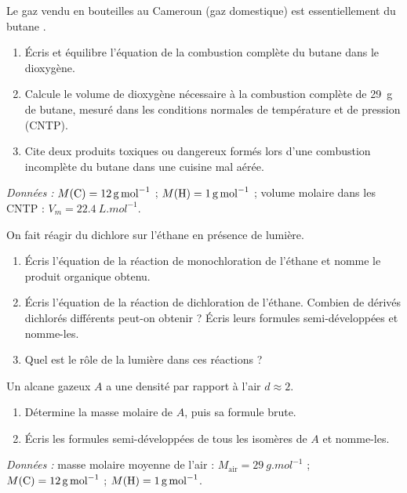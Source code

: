\documentclass[11pt]{article}
\begin{document}
\begin{exercice}
Le gaz vendu en bouteilles au Cameroun (gaz domestique) est essentiellement du butane .
\begin{enumerate}
\item Écris et équilibre l'équation de la combustion complète du butane dans le dioxygène.
\item Calcule le volume de dioxygène nécessaire à la combustion complète de \SI{29}{g} de butane, mesuré dans les conditions normales de température et de pression (CNTP).
\item Cite deux produits toxiques ou dangereux formés lors d'une combustion incomplète du butane dans une cuisine mal aérée.
\end{enumerate}
\emph{Données :} $M(\ce{C}) = \SI{12}{g.mol^{-1}}$ ; $M(\ce{H}) = \SI{1}{g.mol^{-1}}$ ; volume molaire dans les CNTP : $V_m = \SI{22,4}{L.mol^{-1}}$.
\end{exercice}

\begin{exercice}
On fait réagir du dichlore sur l'éthane  en présence de lumière.
\begin{enumerate}
\item Écris l'équation de la réaction de monochloration de l'éthane et nomme le produit organique obtenu.
\item Écris l'équation de la réaction de dichloration de l'éthane. Combien de dérivés dichlorés différents peut-on obtenir ? Écris leurs formules semi-développées et nomme-les.
\item Quel est le rôle de la lumière dans ces réactions ?
\end{enumerate}
\end{exercice}

\begin{exercice}
Un alcane gazeux $A$ a une densité par rapport à l'air $d \approx 2$.
\begin{enumerate}
\item Détermine la masse molaire de $A$, puis sa formule brute.
\item Écris les formules semi-développées de tous les isomères de $A$ et nomme-les.
\end{enumerate}
\emph{Données :} masse molaire moyenne de l'air : $M_{\text{air}} = \SI{29}{g.mol^{-1}}$ ; $M(\ce{C}) = \SI{12}{g.mol^{-1}}$ ; $M(\ce{H}) = \SI{1}{g.mol^{-1}}$.
\end{exercice}
\end{document}

